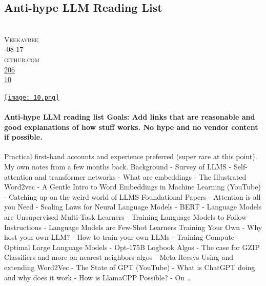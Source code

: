 \documentclass[10pt,a4paper]{article}
\begin{document}
\subsection{Anti-hype LLM Reading List}
\noindent\begin{minipage}[t]{0.19\linewidth}
\vspace{0pt}
\noindent\scshape\footnotesize
\\ {\scriptsize\faUser}\space 
Veekaybee
\\ {\scriptsize\faCalendar}-08-17
\\ {\scriptsize\faGithub}\space 
github.com
\\ {\scriptsize\faThumbsOUp}\space 
\href{http://news.ycombinator.com/item?id=37281020\&utm\_term=comment}{206} 
\\ {\scriptsize\faComments}\space 
\href{http://news.ycombinator.com/item?id=37281020\&utm\_term=comment}{10} 
\end{minipage} 
\begin{minipage}[t]{0.80\linewidth}
\vspace{0pt}
\begin{multicols}{2}
    \href{https://gist.github.com/veekaybee/be375ab33085102f9027853128dc5f0e?utm\_source=hackernewsletter\&utm\_medium=email\&utm\_term=fav}{
        \texttt{[image: 10.png]}
    }
\paragraph{Anti-hype LLM reading list
Goals: Add links that are reasonable and good explanations of how stuff works. No hype and no vendor content if possible.}
 Practical first-hand accounts and experience preferred (super rare at this point).
My own notes from a few months back.
Background
- Survey of LLMS
- Self-attention and transformer networks
- What are embeddings
- The Illustrated Word2vec - A Gentle Intro to Word Embeddings in Machine Learning (YouTube)
- Catching up on the weird world of LLMS
Foundational Papers
- Attention is all you Need
- Scaling Laws for Neural Language Models
- BERT
- Language Models are Unsupervised Multi-Task Learners
- Training Language Models to Follow Instructions
- Language Models are Few-Shot Learners
Training Your Own
- Why host your own LLM?
- How to train your own LLMs
- Training Compute-Optimal Large Language Models
- Opt-175B Logbook
Algos
- The case for GZIP Classifiers and more on nearest neighbors algos
- Meta Recsys Using and extending Word2Vec
- The State of GPT (YouTube)
- What is ChatGPT doing and why does it work
- How is LlamaCPP Possible?
- On
\dots
\end{multicols}
\end{minipage}
\par\medskip
\end{document}
